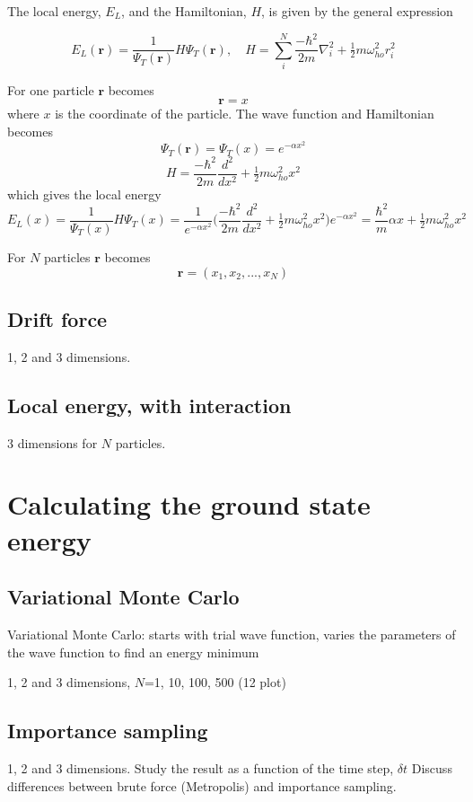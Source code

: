 \documentclass{article}
\begin{document}
The local energy, $E_L$, and the Hamiltonian, $H$, is given by the general expression 

$$E_L(\mathbf{r})=\frac{1}{\Psi_T(\mathbf{r})}H\Psi_T(\mathbf{r}) ,\quad H=\sum_{i}^{N}\frac{-\hbar^2}{2m}\nabla_i^2+\tfrac{1}{2}m\omega_{ho}^2r_i^2$$

For one particle $\mathbf{r}$ becomes
$$\mathbf{r}=x$$
where $x$ is the coordinate of the particle. The wave function and Hamiltonian becomes 
$$\Psi_T(\mathbf{r})=\Psi_T(x)=e^{-\alpha x^2}$$
$$H=\frac{-\hbar^2}{2m}\frac{d^2}{dx^2}+\tfrac{1}{2}m\omega_{ho}^2x^2$$
which gives the local energy
$$E_L(x)=\frac{1}{\Psi_T(x)}H\Psi_T(x)=\frac{1}{e^{-\alpha x^2}}\Big(\frac{-\hbar^2}{2m}\frac{d^2}{dx^2}+\tfrac{1}{2}m\omega_{ho}^2x^2\Big)e^{-\alpha x^2}=\frac{\hbar^2}{m} \alpha x+\tfrac{1}{2}m\omega_{ho}^2x^2$$

For $N$ particles $\mathbf{r}$ becomes
$$\mathbf{r}=(x_1, x_2, ..., x_N)$$

\subsection{Drift force}
1, 2 and 3 dimensions.

\subsection{Local energy, with interaction}
3 dimensions for $N$ particles.

\section{Calculating the ground state energy}

\subsection{Variational Monte Carlo}
Variational Monte Carlo: starts with trial wave function, varies the parameters of the wave function to find an energy minimum

1, 2 and 3 dimensions, $N$=1, 10, 100, 500 (12 plot)

\subsection{Importance sampling}
1, 2 and 3 dimensions. Study the result as a function of the time step, $\delta t$
Discuss differences between brute force (Metropolis) and importance sampling. 
\end{document}
